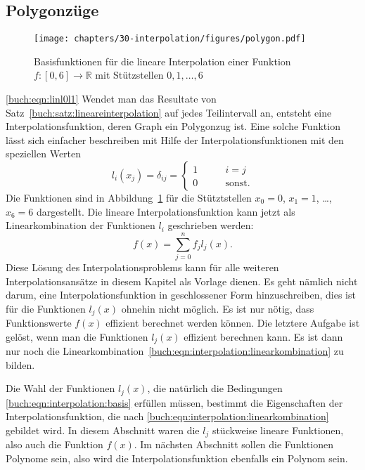 \subsection{Polygonzüge
\label{buch:subsection:polygonzuege}}
\begin{figure}
\centering
\texttt{[image: chapters/30-interpolation/figures/polygon.pdf]}
\caption{Basisfunktionen für die lineare Interpolation einer 
Funktion $f\colon[0,6]\to\mathbb R$ mit Stützstellen $0,1,\dots,6$
\label{buch:figure:polygonbasis}}
\end{figure}
\eqref{buch:eqn:linl0l1}
Wendet man das Resultate von Satz~\ref{buch:satz:lineareinterpolation}
auf jedes Teilintervall an, entsteht eine Interpolationsfunktion, deren
Graph ein Polygonzug ist.
%
%
%
Eine solche Funktion lässt sich einfacher beschreiben mit Hilfe
der Interpolationsfunktionen mit den speziellen Werten
\begin{equation}
l_i(x_j) = \delta_{ij} =\begin{cases}
1&\qquad i=j\\
0&\qquad\text{sonst.}
\end{cases}
\label{buch:eqn:interpolation:basis}
\end{equation}
Die Funktionen sind in Abbildung~\ref{buch:figure:polygonbasis} für
die Stütztstellen $x_0=0$, $x_1=1$, \dots , $x_6=6$ dargestellt.
Die lineare Interpolationsfunktion kann jetzt als Linearkombination
der Funktionen $l_i$ geschrieben werden:
\begin{equation}
f(x)
=
\sum_{j=0}^n f_j l_j(x).
\label{buch:eqn:interpolation:linearkombination}
\end{equation}
Diese Lösung des Interpolationsproblems kann für alle weiteren
Interpolationsansätze in diesem Kapitel als Vorlage dienen.
Es geht nämlich nicht darum, eine Interpolationsfunktion in
geschlossener Form hinzuschreiben, dies ist für die Funktionen $l_j(x)$
ohnehin nicht möglich.
Es ist nur nötig, dass Funktionswerte $f(x)$ effizient berechnet
werden können.
Die letztere Aufgabe ist gelöst, wenn man die Funktionen $l_j(x)$
effizient berechnen kann.
Es ist dann nur noch die
Linearkombination~\eqref{buch:eqn:interpolation:linearkombination}
zu bilden.

Die Wahl der Funktionen $l_j(x)$, die natürlich die Bedingungen
\eqref{buch:eqn:interpolation:basis} erfüllen müssen,
bestimmt die Eigenschaften der
Interpolationsfunktion, die nach 
\eqref{buch:eqn:interpolation:linearkombination}
gebildet wird.
In diesem Abschnitt waren die $l_j$ stückweise lineare Funktionen,
also auch die Funktion $f(x)$.
%
Im nächsten Abschnitt sollen die Funktionen Polynome sein,
also wird die Interpolationsfunktion ebenfalls ein Polynom sein.






